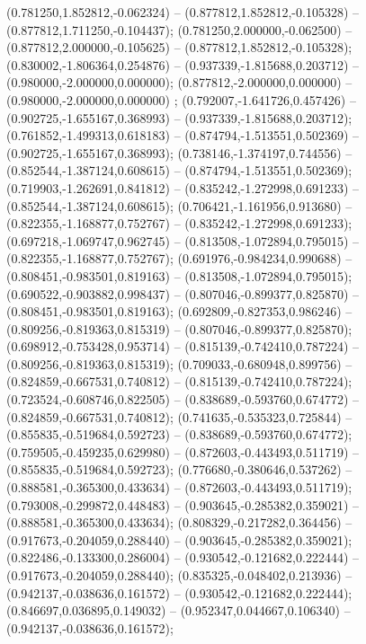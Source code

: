  (0.781250,1.852812,-0.062324) -- (0.877812,1.852812,-0.105328) -- (0.877812,1.711250,-0.104437);
 (0.781250,2.000000,-0.062500) -- (0.877812,2.000000,-0.105625) -- (0.877812,1.852812,-0.105328);
 (0.830002,-1.806364,0.254876) -- (0.937339,-1.815688,0.203712) -- (0.980000,-2.000000,0.000000);
 (0.877812,-2.000000,0.000000) -- (0.980000,-2.000000,0.000000) ;
 (0.792007,-1.641726,0.457426) -- (0.902725,-1.655167,0.368993) -- (0.937339,-1.815688,0.203712);
 (0.761852,-1.499313,0.618183) -- (0.874794,-1.513551,0.502369) -- (0.902725,-1.655167,0.368993);
 (0.738146,-1.374197,0.744556) -- (0.852544,-1.387124,0.608615) -- (0.874794,-1.513551,0.502369);
 (0.719903,-1.262691,0.841812) -- (0.835242,-1.272998,0.691233) -- (0.852544,-1.387124,0.608615);
 (0.706421,-1.161956,0.913680) -- (0.822355,-1.168877,0.752767) -- (0.835242,-1.272998,0.691233);
 (0.697218,-1.069747,0.962745) -- (0.813508,-1.072894,0.795015) -- (0.822355,-1.168877,0.752767);
 (0.691976,-0.984234,0.990688) -- (0.808451,-0.983501,0.819163) -- (0.813508,-1.072894,0.795015);
 (0.690522,-0.903882,0.998437) -- (0.807046,-0.899377,0.825870) -- (0.808451,-0.983501,0.819163);
 (0.692809,-0.827353,0.986246) -- (0.809256,-0.819363,0.815319) -- (0.807046,-0.899377,0.825870);
 (0.698912,-0.753428,0.953714) -- (0.815139,-0.742410,0.787224) -- (0.809256,-0.819363,0.815319);
 (0.709033,-0.680948,0.899756) -- (0.824859,-0.667531,0.740812) -- (0.815139,-0.742410,0.787224);
 (0.723524,-0.608746,0.822505) -- (0.838689,-0.593760,0.674772) -- (0.824859,-0.667531,0.740812);
 (0.741635,-0.535323,0.725844) -- (0.855835,-0.519684,0.592723) -- (0.838689,-0.593760,0.674772);
 (0.759505,-0.459235,0.629980) -- (0.872603,-0.443493,0.511719) -- (0.855835,-0.519684,0.592723);
 (0.776680,-0.380646,0.537262) -- (0.888581,-0.365300,0.433634) -- (0.872603,-0.443493,0.511719);
 (0.793008,-0.299872,0.448483) -- (0.903645,-0.285382,0.359021) -- (0.888581,-0.365300,0.433634);
 (0.808329,-0.217282,0.364456) -- (0.917673,-0.204059,0.288440) -- (0.903645,-0.285382,0.359021);
 (0.822486,-0.133300,0.286004) -- (0.930542,-0.121682,0.222444) -- (0.917673,-0.204059,0.288440);
 (0.835325,-0.048402,0.213936) -- (0.942137,-0.038636,0.161572) -- (0.930542,-0.121682,0.222444);
 (0.846697,0.036895,0.149032) -- (0.952347,0.044667,0.106340) -- (0.942137,-0.038636,0.161572);

